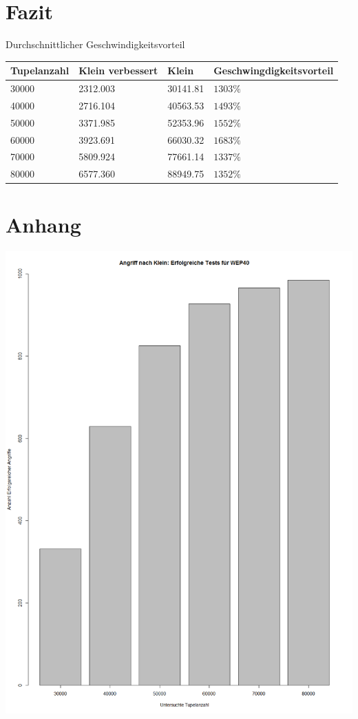 \documentclass[10pt,a4paper]{article}
\begin{document}
\section{Fazit}

Durchschnittlicher Geschwindigkeitsvorteil\\
\begin{tabular}{|l|l|l|l|}
	\hline
	Tupelanzahl & Klein verbessert   	& Klein  & Geschwingdigkeitsvorteil	 \\
			\hline
		30000& 2312.003& 30141.81 & $1303\%$\\
			\hline
		40000& 2716.104& 40563.53 & $1493\%$\\
			\hline
		50000& 3371.985& 52353.96 & $1552\%$\\
			\hline
		60000& 3923.691& 66030.32 & $1683\%$\\
			\hline
		70000& 5809.924& 77661.14 & $1337\%$\\
			\hline
		80000& 6577.360& 88949.75 & $1352\%$\\
	\hline
	
\end{tabular}



\section{Anhang}

\includegraphics[width=\textwidth]{img/wep40_erfolg.png}
\label{fig:wep40_suc}
\newpage
\end{document}

